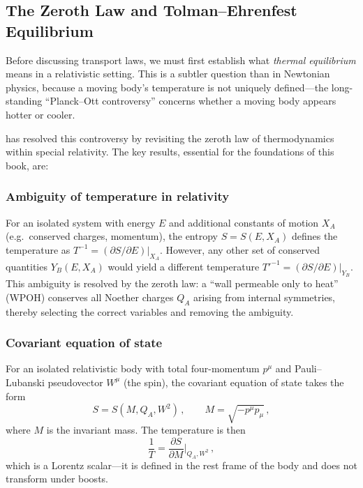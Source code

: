 \subsection{The Zeroth Law and Tolman--Ehrenfest Equilibrium}
\label{subsec:zeroth-law}

Before discussing transport laws, we must first establish what
\emph{thermal equilibrium} means in a relativistic setting.  This is
a subtler question than in Newtonian physics, because a moving body's
temperature is not uniquely defined---the long-standing ``Planck--Ott
controversy'' concerns whether a moving body appears hotter or cooler.

\citet{GavassinoZerothLaw2020} has resolved this controversy by
revisiting the zeroth law of thermodynamics within special relativity.
The key results, essential for the foundations of this book, are:

\subsubsection{Ambiguity of temperature in relativity}
For an isolated system with energy $E$ and additional constants of
motion $X_A$ (e.g.\ conserved charges, momentum), the entropy
$S = S(E, X_A)$ defines the temperature as
$T^{-1} = (\partial S/\partial E)|_{X_A}$.  However, any other set
of conserved quantities $Y_B(E, X_A)$ would yield a different
temperature $T'^{-1} = (\partial S/\partial E)|_{Y_B}$.  This
ambiguity is resolved by the zeroth law: a ``wall permeable only to
heat'' (WPOH) conserves all Noether charges $Q_A$ arising from
internal symmetries, thereby selecting the correct variables and
removing the ambiguity.

\subsubsection{Covariant equation of state}
For an isolated relativistic body with total four-momentum $p^\mu$
and Pauli--Lubanski pseudovector $W^\mu$ (the spin), the covariant
equation of state takes the form
\begin{equation}
  S = S(M, Q_A, W^2)\,,\qquad
  M = \sqrt{-p^\mu p_\mu}\,,
  \label{eq:cov-eos}
\end{equation}
where $M$ is the invariant mass.  The temperature is then
\begin{equation}
  \frac{1}{T} = \frac{\partial S}{\partial M}\bigg|_{Q_A, W^2}\,,
  \label{eq:rel-temperature}
\end{equation}
which is a Lorentz scalar---it is defined in the rest frame of the
body and does not transform under boosts.

